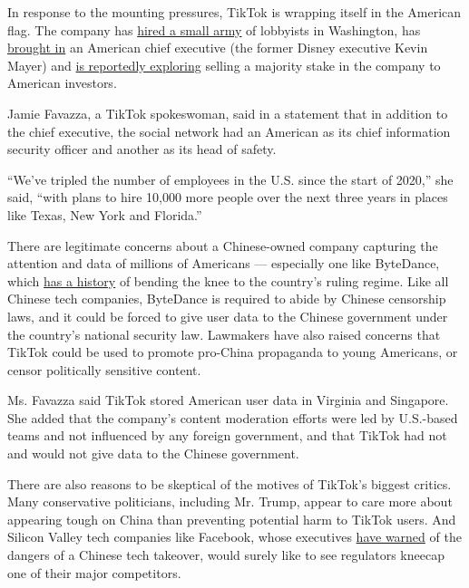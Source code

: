 In response to the mounting pressures, TikTok is wrapping itself in the
American flag. The company has
\href{https://www.nytimes.com/2020/07/15/technology/tiktok-washington-lobbyist.html}{hired
a small army} of lobbyists in Washington, has
\href{https://www.nytimes.com/2020/05/18/business/media/tiktok-ceo-kevin-mayer.html}{brought
in} an American chief executive (the former Disney executive Kevin
Mayer) and
\href{https://www.nytimes.com/2020/07/23/business/dealbook/tiktok-bytedance-investors-trump.html}{is
reportedly exploring} selling a majority stake in the company to
American investors.

Jamie Favazza, a TikTok spokeswoman, said in a statement that in
addition to the chief executive, the social network had an American as
its chief information security officer and another as its head of
safety.

``We've tripled the number of employees in the U.S. since the start of
2020,'' she said, ``with plans to hire 10,000 more people over the next
three years in places like Texas, New York and Florida.''

There are legitimate concerns about a Chinese-owned company capturing
the attention and data of millions of Americans --- especially one like
ByteDance, which
\href{https://www.nytimes.com/2019/11/05/business/tiktok-china-bytedance.html}{has
a history} of bending the knee to the country's ruling regime. Like all
Chinese tech companies, ByteDance is required to abide by Chinese
censorship laws, and it could be forced to give user data to the Chinese
government under the country's national security law. Lawmakers have
also raised concerns that TikTok could be used to promote pro-China
propaganda to young Americans, or censor politically sensitive content.

Ms. Favazza said TikTok stored American user data in Virginia and
Singapore. She added that the company's content moderation efforts were
led by U.S.-based teams and not influenced by any foreign government,
and that TikTok had not and would not give data to the Chinese
government.

There are also reasons to be skeptical of the motives of TikTok's
biggest critics. Many conservative politicians, including Mr. Trump,
appear to care more about appearing tough on China than preventing
potential harm to TikTok users. And Silicon Valley tech companies like
Facebook, whose executives
\href{https://www.cnbc.com/2019/10/17/facebook-ceo-zuckerberg-calls-out-tiktok-censorship-in-china.html}{have
warned} of the dangers of a Chinese tech takeover, would surely like to
see regulators kneecap one of their major competitors.

